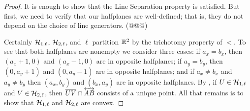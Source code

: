 \begin{proof}
It is enough to show that the Line Separation property is satisfied.
But first, we need to verify that our halfplanes are well-defined; that is, they do not depend on the choice of line generators.
(@@@)

Certainly \(\mathcal{H}_{1,\ell}\), \(\mathcal{H}_{2,\ell}\), and \(\ell\) partition \(\mathbb{R}^2\) by the trichotomy property of \(<\).
To see that both halfplanes are nonempty we consider three cases: if \(a_x = b_x\), then \((a_x+1,0)\) and \((a_x-1,0)\) are in opposite halfplanes; if \(a_y = b_y\), then \((0,a_y+1)\) and \((0,a_y-1)\) are in opposite halfplanes; and if \(a_x \neq b_x\) and \(a_y \neq b_y\) then \((a_x,b_y)\) and \((b_x,a_y)\) are in opposite halfplanes.
By , if \(U \in \mathcal{H}_{1,\ell}\) and \(V \in \mathcal{H}_{2,\ell}\), then \(\overline{UV} \cap \overleftrightarrow{AB}\) consists of a unique point.
All that remains is to show that \(\mathcal{H}_{1,\ell}\) and \(\mathcal{H}_{2,\ell}\) are convex.


\end{proof}

